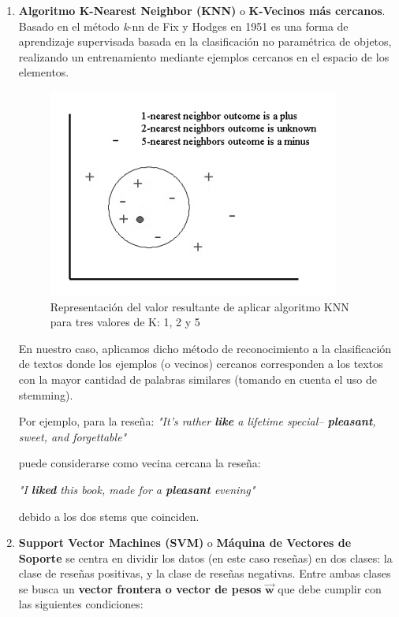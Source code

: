 \documentclass[hidelinks]{sig-alternate-05-2015}
\begin{document}
\begin{enumerate}

\item \textbf{Algoritmo K-Nearest Neighbor (KNN)} o \textbf{K-Vecinos más cercanos}. Basado en el método \textit{k}-nn de Fix y Hodges en 1951\cite{fix:knn} es una forma de aprendizaje supervisada basada en la clasificación no paramétrica de objetos, realizando un entrenamiento mediante ejemplos cercanos en el espacio de los elementos. 

\vskip -5pt
\begin{figure}[H]
\centering
\includegraphics[keepaspectratio=true,scale=0.75]{knn.jpg}
\vskip -6pt
\caption{Representación del valor resultante de aplicar algoritmo KNN para tres valores de K: 1, 2 y 5 \cite{statsoft:knn}}
\end{figure}
\vskip -5pt

En nuestro caso, aplicamos dicho método de reconocimiento a la clasificación de textos donde los ejemplos (o vecinos) cercanos corresponden a los textos con la mayor cantidad de palabras similares (tomando en cuenta el uso de stemming).

Por ejemplo, para la reseña:
\vskip 3pt
\textit{"It's rather \textbf{like} a lifetime special-- \textbf{pleasant}, sweet, and forgettable"} 
\vskip 3pt

puede considerarse como vecina cercana la reseña:

\vskip 3pt
\textit{"I \textbf{liked} this book, made for a \textbf{pleasant} evening"} 
\vskip 3pt

debido a los dos stems que coinciden. 

\item \textbf{Support Vector Machines (SVM)} o \textbf{Máquina de Vectores de Soporte} se centra en dividir los datos (en este caso reseñas) en dos clases: la clase de reseñas positivas, y la clase de reseñas negativas. Entre ambas clases se busca un \textbf{vector frontera o vector de pesos} \begin{math}\vec{\textbf{w}}\end{math} que debe cumplir con las siguientes condiciones:


\end{enumerate}
\end{document}
